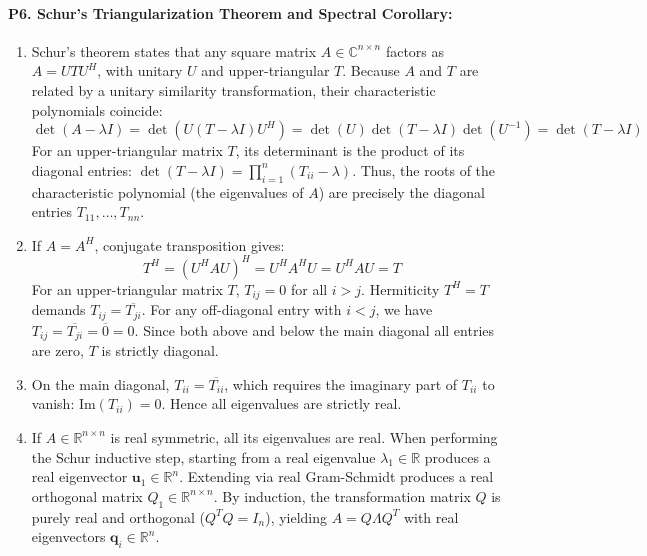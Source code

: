 \paragraph{P6. Schur's Triangularization Theorem and Spectral Corollary:}
\begin{enumerate}[label=(\alph*)]
    \item Schur's theorem states that any square matrix $A \in \mathbb{C}^{n \times n}$ factors as $A = U T U^H$, with unitary $U$ and upper-triangular $T$.
    Because $A$ and $T$ are related by a unitary similarity transformation, their characteristic polynomials coincide:
    \begin{equation*}
    \det(A - \lambda I) = \det(U(T - \lambda I)U^H) = \det(U)\det(T - \lambda I)\det(U^{-1}) = \det(T - \lambda I)
    \end{equation*}
    For an upper-triangular matrix $T$, its determinant is the product of its diagonal entries: $\det(T - \lambda I) = \prod_{i=1}^n (T_{ii} - \lambda)$. Thus, the roots of the characteristic polynomial (the eigenvalues of $A$) are precisely the diagonal entries $T_{11}, \dots, T_{nn}$.
    \item If $A = A^H$, conjugate transposition gives:
    \begin{equation*}
    T^H = (U^H A U)^H = U^H A^H U = U^H A U = T
    \end{equation*}
    For an upper-triangular matrix $T$, $T_{ij} = 0$ for all $i > j$.
    Hermiticity $T^H = T$ demands $T_{ij} = \overline{T_{ji}}$.
    For any off-diagonal entry with $i < j$, we have $T_{ij} = \overline{T_{ji}} = \overline{0} = 0$.
    Since both above and below the main diagonal all entries are zero, $T$ is strictly diagonal.
    \item On the main diagonal, $T_{ii} = \overline{T_{ii}}$, which requires the imaginary part of $T_{ii}$ to vanish: $\text{Im}(T_{ii}) = 0$. Hence all eigenvalues are strictly real.
    \item If $A \in \mathbb{R}^{n \times n}$ is real symmetric, all its eigenvalues are real. When performing the Schur inductive step, starting from a real eigenvalue $\lambda_1 \in \mathbb{R}$ produces a real eigenvector $\mathbf{u}_1 \in \mathbb{R}^n$. Extending via real Gram-Schmidt produces a real orthogonal matrix $Q_1 \in \mathbb{R}^{n \times n}$. By induction, the transformation matrix $Q$ is purely real and orthogonal ($Q^T Q = I_n$), yielding $A = Q \Lambda Q^T$ with real eigenvectors $\mathbf{q}_i \in \mathbb{R}^n$.
\end{enumerate}

